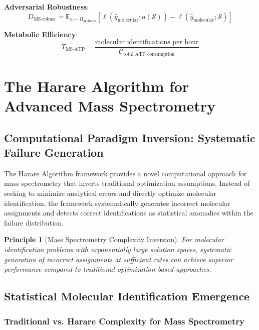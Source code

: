 \documentclass[11pt,a4paper]{article}
\newtheorem{principle}[theorem]{Principle}
\theoremstyle{remark}
\begin{document}
\textbf{Adversarial Robustness}:
\begin{equation}
D_{\text{MS-robust}} = \mathbb{E}_{a \sim \Pi_{\text{artifacts}}}\left[\ell(\hat{y}_{\text{molecular}}; a(\mathcal{S})) - \ell(\hat{y}_{\text{molecular}}; \mathcal{S})\right]
\end{equation}

\textbf{Metabolic Efficiency}:
\begin{equation}
T_{\text{MS-ATP}} = \frac{\text{molecular identifications per hour}}{\mathcal{C}_{\text{total ATP consumption}}}
\end{equation}

\section{The Harare Algorithm for Advanced Mass Spectrometry}

\subsection{Computational Paradigm Inversion: Systematic Failure Generation}

The Harare Algorithm framework provides a novel computational approach for mass spectrometry that inverts traditional optimization assumptions. Instead of seeking to minimize analytical errors and directly optimize molecular identification, the framework systematically generates incorrect molecular assignments and detects correct identifications as statistical anomalies within the failure distribution.

\begin{principle}[Mass Spectrometry Complexity Inversion]
For molecular identification problems with exponentially large solution spaces, systematic generation of incorrect assignments at sufficient rates can achieve superior performance compared to traditional optimization-based approaches.
\end{principle}

\subsection{Statistical Molecular Identification Emergence}

\subsubsection{Traditional vs. Harare Complexity for Mass Spectrometry}
\end{document}
